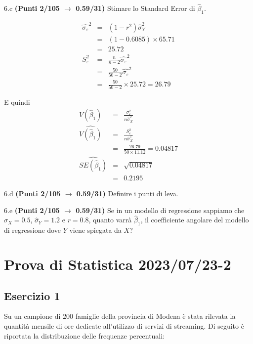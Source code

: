 \documentclass[
  11pt,
]{book}
\theoremstyle{mytheoremstyle}
\theoremstyle{mydefstyle}
\newenvironment{sol}
  {
  \begin{tcolorbox}[enhanced,breakable,arc=0.1mm,boxrule=1pt,colback=white,colframe=iblue,
  title=\bf \fontfamily{lmss}\selectfont \hspace{.5 cm} Soluzione,drop fuzzy shadow]

}{
\end{tcolorbox}
  }
\begin{document}
6.c \textbf{(Punti 2/105 \(\rightarrow\) 0.59/31)} Stimare lo Standard Error di \(\hat\beta_1\).

\begin{sol}
\begin{eqnarray*}
\hat{\sigma_\varepsilon}^2&=&(1-r^2)\hat\sigma_Y^2\\
&=& (1- 0.6085 )\times 65.71 \\
   &=&  25.72 \\
   S_\varepsilon^2 &=& \frac{n} {n-2} \hat{\sigma_\varepsilon}^2\\
   &=&  \frac{ 50 } { 50 -2} \hat{\sigma_\varepsilon}^2 \\
 &=&  \frac{ 50 } { 50 -2} \times  25.72  =  26.79  
\end{eqnarray*}

E quindi\begin{eqnarray*}
V(\hat\beta_{1}) &=& \frac{\sigma_{\varepsilon}^{2}} {n \hat{\sigma}^{2}_{X}} \\
\widehat{V(\hat\beta_{1})} &=& \frac{S_{\varepsilon}^{2}} {n \hat{\sigma}^{2}_{X}} \\
 &=& \frac{ 26.79 } { 50 \times  11.12 } =  0.04817 \\
 \widehat{SE(\hat\beta_{1})}        &=&  \sqrt{ 0.04817 }\\
 &=&  0.2195 
\end{eqnarray*}

\end{sol}

6.d \textbf{(Punti 2/105 \(\rightarrow\) 0.59/31)} Definire i punti di leva.

6.e \textbf{(Punti 2/105 \(\rightarrow\) 0.59/31)} Se in un modello di regressione sappiamo che \(\hat\sigma_X=0.5\), \(\hat\sigma_Y=1.2\) e \(r=0.8\), quanto varrà \(\hat\beta_1\), il coefficiente angolare del modello di regressione dove \(Y\) viene spiegata da \(X\)?

\section{Prova di Statistica 2023/07/23-2}\label{prova-di-statistica-20230723-2}

\subsection{Esercizio 1}\label{esercizio-1-33}

Su un campione di \(200\) famiglie della provincia di Modena è stata rilevata la quantità mensile di ore dedicate all'utilizzo di servizi di streaming. Di seguito è riportata la distribuzione delle frequenze percentuali:
\end{document}
